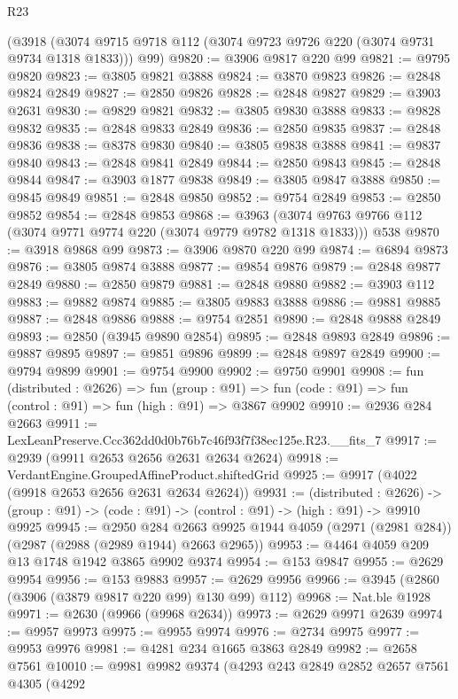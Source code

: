 \begin{lexlean}{R23}
\begin{coremodule}
    (@3918 (@3074 @9715 @9718 @112 (@3074 @9723 @9726 @220 (@3074 @9731 @9734 @1318 @1833))) @99)
@9820 := @3906 @9817 @220 @99
@9821 := @9795 @9820
@9823 := @3805 @9821 @3888
@9824 := @3870 @9823
@9826 := @2848 @9824 @2849
@9827 := @2850 @9826
@9828 := @2848 @9827
@9829 := @3903 @2631
@9830 := @9829 @9821
@9832 := @3805 @9830 @3888
@9833 := @9828 @9832
@9835 := @2848 @9833 @2849
@9836 := @2850 @9835
@9837 := @2848 @9836
@9838 := @8378 @9830
@9840 := @3805 @9838 @3888
@9841 := @9837 @9840
@9843 := @2848 @9841 @2849
@9844 := @2850 @9843
@9845 := @2848 @9844
@9847 := @3903 @1877 @9838
@9849 := @3805 @9847 @3888
@9850 := @9845 @9849
@9851 := @2848 @9850
@9852 := @9754 @2849
@9853 := @2850 @9852
@9854 := @2848 @9853
@9868 := @3963
    (@3074 @9763 @9766 @112 (@3074 @9771 @9774 @220 (@3074 @9779 @9782 @1318 @1833)))
    @538
@9870 := @3918 @9868 @99
@9873 := @3906 @9870 @220 @99
@9874 := @6894 @9873
@9876 := @3805 @9874 @3888
@9877 := @9854 @9876
@9879 := @2848 @9877 @2849
@9880 := @2850 @9879
@9881 := @2848 @9880
@9882 := @3903 @112
@9883 := @9882 @9874
@9885 := @3805 @9883 @3888
@9886 := @9881 @9885
@9887 := @2848 @9886
@9888 := @9754 @2851
@9890 := @2848 @9888 @2849
@9893 := @2850 (@3945 @9890 @2854)
@9895 := @2848 @9893 @2849
@9896 := @9887 @9895
@9897 := @9851 @9896
@9899 := @2848 @9897 @2849
@9900 := @9794 @9899
@9901 := @9754 @9900
@9902 := @9750 @9901
@9908 := fun (distributed : @2626) =>
  fun (group : @91) => fun (code : @91) => fun (control : @91) => fun (high : @91) => @3867 @9902
@9910 := @2936 @284 @2663
@9911 := LexLeanPreserve.Ccc362dd0d0b76b7c46f93f7f38ec125e.R23.__fits_7
@9917 := @2939 (@9911 @2653 @2656 @2631 @2634 @2624)
@9918 := VerdantEngine.GroupedAffineProduct.shiftedGrid
@9925 := @9917 (@4022 (@9918 @2653 @2656 @2631 @2634 @2624))
@9931 := (distributed : @2626) ->
  (group : @91) -> (code : @91) -> (control : @91) -> (high : @91) -> @9910 @9925
@9945 := @2950
    @284
    @2663
    @9925
    @1944
    @4059
    (@2971 (@2981 @284))
    (@2987 (@2988 (@2989 @1944) @2663 @2965))
@9953 := @4464 @4059 @209 @13 @1748 @1942 @3865 @9902 @9374
@9954 := @153 @9847
@9955 := @2629 @9954
@9956 := @153 @9883
@9957 := @2629 @9956
@9966 := @3945 (@2860 (@3906 (@3879 @9817 @220 @99) @130 @99) @112)
@9968 := Nat.ble @1928
@9971 := @2630 (@9966 (@9968 @2634))
@9973 := @2629 @9971 @2639
@9974 := @9957 @9973
@9975 := @9955 @9974
@9976 := @2734 @9975
@9977 := @9953 @9976
@9981 := @4281 @234 @1665 @3863 @2849
@9982 := @2658 @7561
@10010 := @9981
    @9982
    @9374
    (@4293
      @243
      @2849
      @2852
      @2657
      @7561
      @4305
      (@4292

\end{coremodule}
\end{lexlean}
